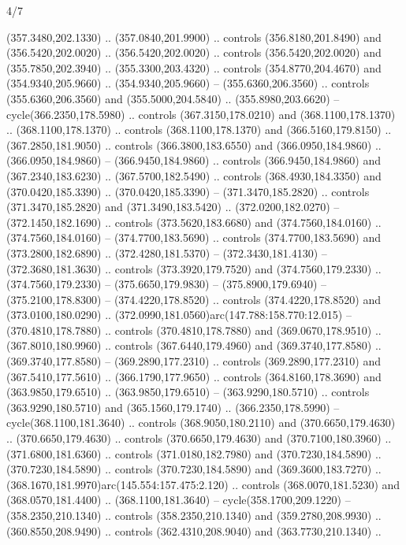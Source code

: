 \begin{flagdescription}{4/7}
\begin{scope}[shift={(0.5\flaglength,0.5\flagwidth)},scale=\flagwidth*\stretchfactor/820]
\begin{scope}[scale=1.87,xshift=-138mm,yshift=75mm]
\begin{scope}[y=0.8pt, x=0.8pt, yscale=-1, xscale=1]
\begin{scope}[cm={{1.16833,0.0,0.0,1.16833,(-0.699,1.184)}},fill=c78732e]
  (357.3480,202.1330) .. (357.0840,201.9900) .. controls (356.8180,201.8490) and
  (356.5420,202.0020) .. (356.5420,202.0020) .. controls (356.5420,202.0020) and
  (355.7850,202.3940) .. (355.3300,203.4320) .. controls (354.8770,204.4670) and
  (354.9340,205.9660) .. (354.9340,205.9660) -- (355.6360,206.3560) .. controls
  (355.6360,206.3560) and (355.5000,204.5840) .. (355.8980,203.6620) --
  cycle(366.2350,178.5980) .. controls (367.3150,178.0210) and
  (368.1100,178.1370) .. (368.1100,178.1370) .. controls (368.1100,178.1370) and
  (366.5160,179.8150) .. (367.2850,181.9050) .. controls (366.3800,183.6550) and
  (366.0950,184.9860) .. (366.0950,184.9860) -- (366.9450,184.9860) .. controls
  (366.9450,184.9860) and (367.2340,183.6230) .. (367.5700,182.5490) .. controls
  (368.4930,184.3350) and (370.0420,185.3390) .. (370.0420,185.3390) --
  (371.3470,185.2820) .. controls (371.3470,185.2820) and (371.3490,183.5420) ..
  (372.0200,182.0270) -- (372.1450,182.1690) .. controls (373.5620,183.6680) and
  (374.7560,184.0160) .. (374.7560,184.0160) -- (374.7700,183.5690) .. controls
  (374.7700,183.5690) and (373.2800,182.6890) .. (372.4280,181.5370) --
  (372.3430,181.4130) -- (372.3680,181.3630) .. controls (373.3920,179.7520) and
  (374.7560,179.2330) .. (374.7560,179.2330) -- (375.6650,179.9830) --
  (375.8900,179.6940) -- (375.2100,178.8300) -- (374.4220,178.8520) .. controls
  (374.4220,178.8520) and (373.0100,180.0290) ..
  (372.0990,181.0560)arc(147.788:158.770:12.015) -- (370.4810,178.7880) ..
  controls (370.4810,178.7880) and (369.0670,178.9510) .. (367.8010,180.9960) ..
  controls (367.6440,179.4960) and (369.3740,177.8580) .. (369.3740,177.8580) --
  (369.2890,177.2310) .. controls (369.2890,177.2310) and (367.5410,177.5610) ..
  (366.1790,177.9650) .. controls (364.8160,178.3690) and (363.9850,179.6510) ..
  (363.9850,179.6510) -- (363.9290,180.5710) .. controls (363.9290,180.5710) and
  (365.1560,179.1740) .. (366.2350,178.5990) -- cycle(368.1100,181.3640) ..
  controls (368.9050,180.2110) and (370.6650,179.4630) .. (370.6650,179.4630) ..
  controls (370.6650,179.4630) and (370.7100,180.3960) .. (371.6800,181.6360) ..
  controls (371.0180,182.7980) and (370.7230,184.5890) .. (370.7230,184.5890) ..
  controls (370.7230,184.5890) and (369.3600,183.7270) ..
  (368.1670,181.9970)arc(145.554:157.475:2.120) .. controls (368.0070,181.5230)
  and (368.0570,181.4400) .. (368.1100,181.3640) -- cycle(358.1700,209.1220) --
  (358.2350,210.1340) .. controls (358.2350,210.1340) and (359.2780,208.9930) ..
  (360.8550,208.9490) .. controls (362.4310,208.9040) and (363.7730,210.1340) ..

\end{scope}
\end{scope}
\end{scope}
\end{scope}
\end{flagdescription}
